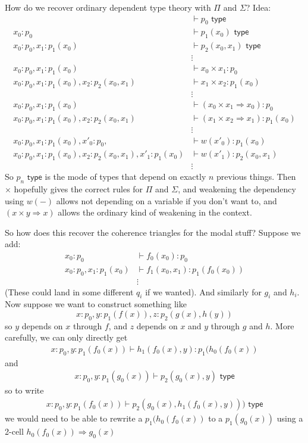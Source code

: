 \documentclass[10pt]{article}
\newcommand{\yields}{\vdash}
\newcommand{\type}{\,\,\mathsf{type}}
\begin{document}
How do we recover ordinary dependent type theory with $\Pi$ and $\Sigma$? Idea:
\begin{align*}
&\yields p_0 \type \\
x_0 : p_0 &\yields p_1(x_0) \type \\
x_0 : p_0, x_1 : p_1(x_0) &\yields p_2(x_0, x_1) \type \\
&\vdots \\
x_0 : p_0, x_1 : p_1(x_0) &\yields x_0 \times x_1 : p_0 \\
x_0 : p_0, x_1 : p_1(x_0), x_2 : p_2(x_0, x_1) &\yields x_1 \times x_2 : p_1(x_0) \\
&\vdots \\
x_0 : p_0, x_1 : p_1(x_0) &\yields (x_0 \times x_1 \Rightarrow x_0) : p_0 \\
x_0 : p_0, x_1 : p_1(x_0), x_2 : p_2(x_0, x_1) &\yields (x_1 \times x_2 \Rightarrow x_1) : p_1(x_0) \\
&\vdots \\
x_0 : p_0, x_1 : p_1(x_0), x'_0 : p_0,  &\yields w(x'_0) : p_1(x_0) \\
x_0 : p_0, x_1 : p_1(x_0), x_2 : p_2(x_0, x_1), x'_1 : p_1(x_0) &\yields w(x'_1) : p_2(x_0, x_1) \\
&\vdots
\end{align*}
So $p_n \type$ is the mode of types that depend on exactly $n$ previous things. Then $\times$ hopefully gives the correct rules for $\Pi$ and $\Sigma$, and weakening the dependency using $w(-)$ allows not depending on a variable if you don't want to, and $(x \times y \Rightarrow x)$ allows the ordinary kind of weakening in the context.

So how does this recover the coherence triangles for the modal stuff? Suppose we add:
\begin{align*}
x_0 : p_0 &\yields f_0(x_0) : p_0 \\ 
x_0 : p_0, x_1 : p_1(x_0) &\yields f_1(x_0, x_1) : p_1(f_0(x_0)) \\
&\vdots
\end{align*}
(These could land in some different $q_i$ if we wanted). And similarly for $g_i$ and $h_i$. Now suppose we want to construct something like \[x:p_0, y : p_1(f(x)), z : p_2(g(x), h(y))\] so $y$ depends on $x$ through $f$, and $z$ depends on $x$ and $y$ through $g$ and $h$. More carefully, we can only directly get
\begin{align*}
x : p_0, y : p_1(f_0(x)) \yields h_1(f_0(x), y) : p_1(h_0(f_0(x))
\end{align*}
and 
\begin{align*}
x : p_0, y : p_1(g_0(x)) \yields p_2(g_0(x), y) \type
\end{align*}
so to write 
\begin{align*}
x : p_0, y : p_1(f_0(x)) \yields p_2(g_0(x), h_1(f_0(x), y))) \type
\end{align*}
we would need to be able to rewrite a $p_1(h_0(f_0(x))$ to a $p_1(g_0(x))$ using a 2-cell $h_0(f_0(x)) \Rightarrow g_0(x)$
\end{document}
